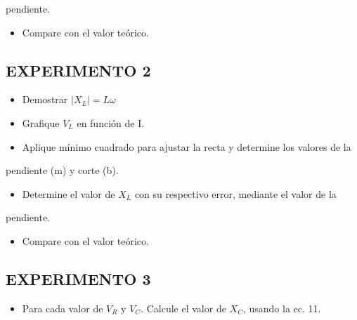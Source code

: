 \documentclass[11pt,a4paper]{article}
\begin{document}
pendiente.

\begin{itemize}[leftmargin=1.4em,itemsep=2pt,topsep=3pt]
  \item Compare con el valor teórico.
\end{itemize}

\subsection*{EXPERIMENTO 2}

\begin{itemize}[leftmargin=1.4em,itemsep=2pt,topsep=3pt]
  \item Demostrar $|X_L| = L\omega$
\end{itemize}

\begin{itemize}[leftmargin=1.4em,itemsep=2pt,topsep=3pt]
  \item Grafique $V_L$ en función de I.
\end{itemize}

\begin{itemize}[leftmargin=1.4em,itemsep=2pt,topsep=3pt]
  \item Aplique mínimo cuadrado para ajustar la recta y determine los valores de la
\end{itemize}

pendiente (m) y corte (b).

\begin{itemize}[leftmargin=1.4em,itemsep=2pt,topsep=3pt]
  \item Determine el valor de $X_L$ con su respectivo error, mediante el valor de la
\end{itemize}

pendiente.

\begin{itemize}[leftmargin=1.4em,itemsep=2pt,topsep=3pt]
  \item Compare con el valor teórico.
\end{itemize}

\subsection*{EXPERIMENTO 3}

\begin{itemize}[leftmargin=1.4em,itemsep=2pt,topsep=3pt]
  \item Para cada valor de $V_R$ y $V_C$. Calcule el valor de $X_C$, usando la ec. 11.
\end{itemize}
\end{document}
